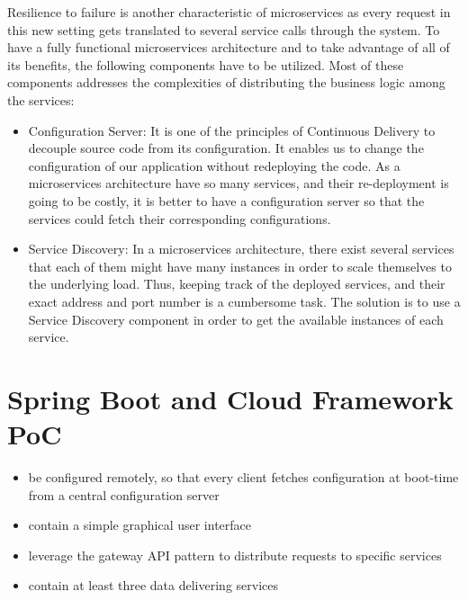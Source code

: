 Resilience to failure is another characteristic of microservices as every request in this new setting gets translated to several service calls through the system. To have a fully functional microservices architecture and to take advantage of all of its benefits, the following components have to be utilized. Most of these components addresses the complexities of distributing the business logic among the services:

\begin{itemize}
	\item Configuration Server: It is one of the principles of Continuous Delivery to decouple source code from its configuration. It enables us to change the configuration of our application without redeploying the code. As a microservices architecture have so many services, and their re-deployment is going to be costly, it is better to have a configuration server so that the services could fetch their corresponding configurations.
\item Service Discovery: 
In a microservices architecture, there exist several services that each of them might have many instances in order to scale themselves to the underlying load. Thus, keeping track of the deployed services, and their exact address and port number is a cumbersome task. The solution is to use a Service Discovery component in order to get the available instances of each service.		
\end{itemize}


\section{Spring Boot and Cloud Framework PoC}
\begin{itemize}
	\item be configured remotely, so that every client fetches configuration at boot-time from a central configuration server
	\item contain a simple graphical user interface
	\item leverage the gateway API pattern to distribute requests to specific services
	\item contain at least three data delivering services 
\end{itemize}

